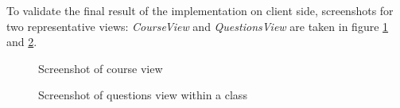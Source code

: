 To validate the final result of the implementation on client side, screenshots for two representative views: \textit{CourseView} and \textit{QuestionsView} are taken in figure \ref{fig:ss-class} and \ref{fig:ss-question}. 

\begin{figure}[!htbp]
  \centering
  \caption{Screenshot of course view}
  \label{fig:ss-class}
\end{figure}
\begin{figure}[!htbp]
  \centering
  \caption{Screenshot of questions view within a class}
  \label{fig:ss-question}
\end{figure}